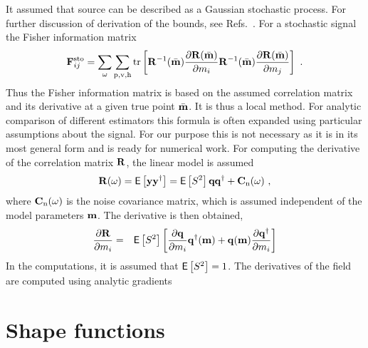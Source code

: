 \documentclass{saclantc}
\newcommand{\E}{{\sf E}}
\begin{document}
It assumed that source can be described as 
 a Gaussian stochastic process. For further
discussion of derivation of the bounds, see Refs.\ \cite{ottersten, baggeroer:asa89}.
For a stochastic signal the Fisher information matrix 
\begin{equation}
{\bf F}_{ij}^{\rm sto} = \sum_{\omega} \sum_{ \rm p,v,h} \mbox{tr}\left[
     {\bf R}^{-1}(\bar{\bf m}) 
                     \frac{\partial{\bf R}(\bar{\bf m})}{\partial m_i} 
     {\bf R}^{-1}(\bar{\bf m}) 
                     \frac{\partial{\bf R}(\bar{\bf m})}{\partial m_j} 
\right]~.
\label{eq:crb-sto}
\end{equation}
Thus the Fisher information matrix is based on the assumed
correlation matrix and its derivative at a given true point $\bar{\bf m}$. It is thus a local method.
For analytic comparison of different estimators this formula is often
expanded using particular assumptions about the signal. For our purpose
this is not necessary as it is in its most general form and is ready
for numerical work.
For computing the 
 derivative of the correlation matrix ${\bf R}$, the linear model 
   is assumed 
\begin{equation}
{\bf R} (\omega) = \E \left[{{\bf y}{\bf y}^\dagger}  \right] = 
\E \left[ {S^2} \right]{\bf q} {\bf q}^\dagger + {\bf C}_{\rm n}(\omega)~,
\label{eq:cor}
\end{equation}
where ${\bf C}_{\rm n}(\omega)$ is the noise covariance matrix, which
is assumed independent of the model parameters $\bf m$.
The derivative is then obtained,
\begin{eqnarray}
\frac{\partial{\bf R}}{\partial {m}_i} &=& \E\left[ {S^2} \right]   
\left[         
\frac{\partial{\bf q}}{\partial {m}_i} {\bf q}^\dagger({\bf m})
+{\bf q}({\bf m}) \frac{\partial{\bf q}^\dagger}{\partial { m}_i}\right]
\end{eqnarray}
In the computations, it is assumed that $\E\left[ {S^2} \right]=1$. The
derivatives of the field are computed using analytic gradients
\cite{gerstoft:asa95}  



\section{Shape functions}
\label{se:eof}
\end{document}

